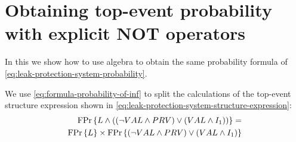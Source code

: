\section{Obtaining top-event probability with explicit \ac*{NOT} operators}
\label{sec:top-event-probability-explicit-not}

In this  we show how to use \ac{algebra} to obtain the same probability formula of \cref{eq:leak-protection-system-probability}.

We use \cref{eq:formula-probability-of-inf} to split the calculations of the top-event structure expression shown in \cref{eq:leak-protection-system-structure-expression}:
\begin{align}
\mathrm{FPr}\left\{L \land 
  \left( \left(\lnot VAL \land PRV\right) \lor 
  \left(VAL \land I_1\right) \right) \right\} = \nonumber\\
  \mathrm{FPr}\left\{L\right\} \times 
  \mathrm{FPr}\left\{\left(\lnot VAL \land PRV\right) \lor 
    \left(VAL \land I_1\right)\right\}\label{eq:leak-protection-system-split}
\end{align}

